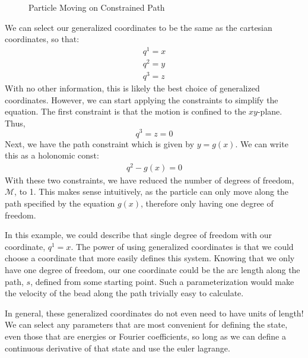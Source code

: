 \begin{figure}[H]

    \caption{Particle Moving on Constrained Path}
    \label{fig:constrainted path}
\end{figure}
We can select our generalized coordinates to be the same as the cartesian coordinates, so that:
\begin{gather}
    q^1=x\\q^2=y\\q^3=z
\end{gather}
With no other information, this is likely the best choice of generalized coordinates. However, we can start applying the constraints to simplify the equation. The first constraint is that the motion is confined to the $xy$-plane. Thus, 
$$q^3=z=0$$
Next, we have the path constraint which is given by $y=g(x)$. We can write this as a \gls{holonomic const}:
\begin{gather}
    q^2-g(x)=0
\end{gather}
With these two constraints, we have reduced the number of degrees of freedom, $\mathcal{M}$, to 1. This makes sense intuitively, as the particle can only move along the path specified by the equation $g(x)$, therefore only having one degree of freedom.

In this example, we could describe that single degree of freedom with our coordinate, $q^1=x$. The power of using generalized coordinates is that we could choose a coordinate that more easily defines this system. Knowing that we only have one degree of freedom, our one coordinate could be the arc length along the path, $s$, defined from some starting point. Such a parameterization would make the velocity of the bead along the path trivially easy to calculate.

In general, these generalized coordinates do not even need to have units of length! We can select any parameters that are most convenient for defining the state, even those that are energies or Fourier coefficients, so long as we can define a continuous derivative of that state and use the \gls{euler lagrange}. 

